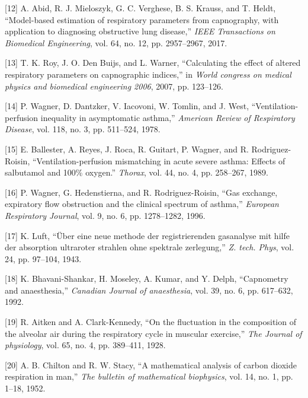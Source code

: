 \documentclass[12pt,]{article}
\begin{document}
\leavevmode\hypertarget{ref-abid2017model}{}%
{[}12{]} A. Abid, R. J. Mieloszyk, G. C. Verghese, B. S. Krauss, and T.
Heldt, ``Model-based estimation of respiratory parameters from
capnography, with application to diagnosing obstructive lung disease,''
\emph{IEEE Transactions on Biomedical Engineering}, vol. 64, no. 12, pp.
2957--2967, 2017.

\leavevmode\hypertarget{ref-roy2007calculating}{}%
{[}13{]} T. K. Roy, J. O. Den Buijs, and L. Warner, ``Calculating the
effect of altered respiratory parameters on capnographic indices,'' in
\emph{World congress on medical physics and biomedical engineering
2006}, 2007, pp. 123--126.

\leavevmode\hypertarget{ref-wagner1978ventilation}{}%
{[}14{]} P. Wagner, D. Dantzker, V. Iacovoni, W. Tomlin, and J. West,
``Ventilation-perfusion inequality in asymptomatic asthma,''
\emph{American Review of Respiratory Disease}, vol. 118, no. 3, pp.
511--524, 1978.

\leavevmode\hypertarget{ref-ballester1989ventilation}{}%
{[}15{]} E. Ballester, A. Reyes, J. Roca, R. Guitart, P. Wagner, and R.
Rodriguez-Roisin, ``Ventilation-perfusion mismatching in acute severe
asthma: Effects of salbutamol and 100\% oxygen.'' \emph{Thorax}, vol.
44, no. 4, pp. 258--267, 1989.

\leavevmode\hypertarget{ref-wagner1996gas}{}%
{[}16{]} P. Wagner, G. Hedenstierna, and R. Rodriguez-Roisin, ``Gas
exchange, expiratory flow obstruction and the clinical spectrum of
asthma,'' \emph{European Respiratory Journal}, vol. 9, no. 6, pp.
1278--1282, 1996.

\leavevmode\hypertarget{ref-luft1943neue}{}%
{[}17{]} K. Luft, ``Über eine neue methode der registrierenden
gasanalyse mit hilfe der absorption ultraroter strahlen ohne spektrale
zerlegung,'' \emph{Z. tech. Phys}, vol. 24, pp. 97--104, 1943.

\leavevmode\hypertarget{ref-bhavani1992capnometry}{}%
{[}18{]} K. Bhavani-Shankar, H. Moseley, A. Kumar, and Y. Delph,
``Capnometry and anaesthesia,'' \emph{Canadian Journal of anaesthesia},
vol. 39, no. 6, pp. 617--632, 1992.

\leavevmode\hypertarget{ref-aitken1928fluctuation}{}%
{[}19{]} R. Aitken and A. Clark-Kennedy, ``On the fluctuation in the
composition of the alveolar air during the respiratory cycle in muscular
exercise,'' \emph{The Journal of physiology}, vol. 65, no. 4, pp.
389--411, 1928.

\leavevmode\hypertarget{ref-chilton1952mathematical}{}%
{[}20{]} A. B. Chilton and R. W. Stacy, ``A mathematical analysis of
carbon dioxide respiration in man,'' \emph{The bulletin of mathematical
biophysics}, vol. 14, no. 1, pp. 1--18, 1952.
\end{document}
